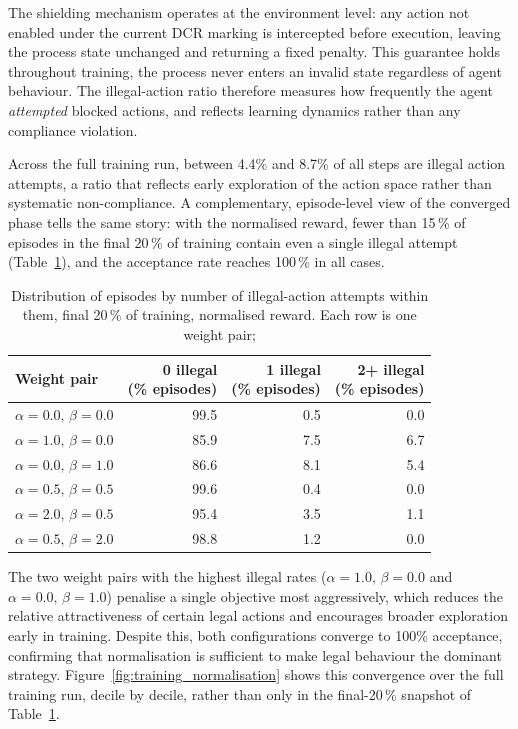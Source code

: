 The shielding mechanism operates at the environment level: any action not enabled under the current \ac{DCR} marking is intercepted before execution, leaving the process state unchanged and returning a fixed
penalty. This guarantee holds throughout training, the process never enters an invalid state regardless of agent behaviour.
The illegal-action ratio therefore measures how frequently the agent \emph{attempted} blocked actions, and reflects learning dynamics rather than any compliance violation.

Across the full training run, between 4.4\% and 8.7\% of all steps
are illegal action attempts, a ratio that reflects early exploration
of the action space rather than systematic non-compliance. A
complementary, episode-level view of the converged phase tells the
same story: with the normalised reward, fewer than 15\,\% of episodes
in the final 20\,\% of training contain even a single illegal
attempt (Table~\ref{tab:illegal_actions}), and the acceptance rate
reaches 100\,\% in all cases.


\begin{table}[H]
\centering
\caption{Distribution of episodes by number of illegal-action attempts within them, final 20\,\% of training, normalised
         reward. Each row is one weight pair;}
\label{tab:illegal_actions}
{\renewcommand{\arraystretch}{1.3}
\setlength{\tabcolsep}{6pt}
\begin{tabular}{lrrr}
\toprule
\textbf{Weight pair} & \shortstack{\textbf{0 illegal}\\\textbf{(\% episodes)}} & \shortstack{\textbf{1 illegal}\\\textbf{(\% episodes)}}
& \shortstack{\textbf{2+ illegal}\\\textbf{(\% episodes)}} \\
\midrule
$\alpha=0.0,\,\beta=0.0$ & 99.5 & 0.5 & 0.0 \\
$\alpha=1.0,\,\beta=0.0$ & 85.9 & 7.5 & 6.7 \\
$\alpha=0.0,\,\beta=1.0$ & 86.6 & 8.1 & 5.4 \\
$\alpha=0.5,\,\beta=0.5$ & 99.6 & 0.4 & 0.0 \\
$\alpha=2.0,\,\beta=0.5$ & 95.4 & 3.5 & 1.1 \\
$\alpha=0.5,\,\beta=2.0$ & 98.8 & 1.2 & 0.0 \\
\bottomrule
\end{tabular}}
\end{table}


The two weight pairs with the highest illegal rates
($\alpha=1.0,\,\beta=0.0$ and $\alpha=0.0,\,\beta=1.0$) penalise a
single objective most aggressively, which reduces the relative
attractiveness of certain legal actions and encourages broader
exploration early in training.
Despite this, both configurations converge to 100\% acceptance,
confirming that normalisation is sufficient to make legal behaviour
the dominant strategy. Figure~\ref{fig:training_normalisation} shows
this convergence over the full training run, decile by decile, rather
than only in the final-20\,\% snapshot of Table~\ref{tab:illegal_actions}.

